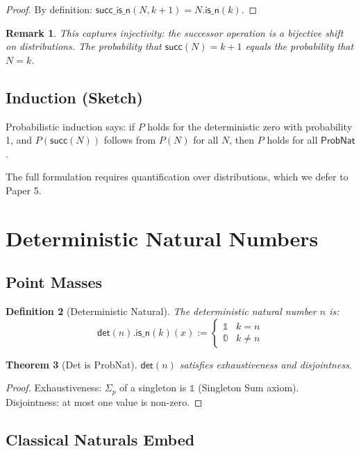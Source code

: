 \documentclass[11pt,a4paper]{article}
\newtheorem{theorem}{Theorem}[section]
\newtheorem{definition}[theorem]{Definition}
\newtheorem{remark}[theorem]{Remark}
\newcommand{\ProbNat}{\mathsf{ProbNat}}
\newcommand{\pzero}{\mathbb{0}}
\newcommand{\pone}{\mathbb{1}}
\newcommand{\psum}{\Sigma_p}
\begin{document}
\begin{proof}
By definition: $\mathsf{succ\_is\_n}(N, k+1) = N.\mathsf{is\_n}(k)$.
\end{proof}

\begin{remark}
This captures injectivity: the successor operation is a bijective shift on distributions. The probability that $\mathsf{succ}(N) = k+1$ equals the probability that $N = k$.
\end{remark}

\subsection{Induction (Sketch)}

Probabilistic induction says: if $P$ holds for the deterministic zero with probability 1, and $P(\mathsf{succ}(N))$ follows from $P(N)$ for all $N$, then $P$ holds for all $\ProbNat$.

The full formulation requires quantification over distributions, which we defer to Paper 5.

\section{Deterministic Natural Numbers}

\subsection{Point Masses}

\begin{definition}[Deterministic Natural]
The deterministic natural number $n$ is:
\[
\mathsf{det}(n).\mathsf{is\_n}(k)(x) := \begin{cases} \pone & k = n \\ \pzero & k \neq n \end{cases}
\]
\end{definition}

\begin{theorem}[Det is ProbNat]
$\mathsf{det}(n)$ satisfies exhaustiveness and disjointness.
\end{theorem}

\begin{proof}
Exhaustiveness: $\psum$ of a singleton is $\pone$ (Singleton Sum axiom).
Disjointness: at most one value is non-zero.
\end{proof}

\subsection{Classical Naturals Embed}
\end{document}
